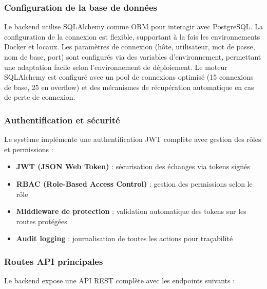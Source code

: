 \documentclass[a4paper, 12pt]{book}
\begin{document}
\subsubsection{Configuration de la base de données}

Le backend utilise SQLAlchemy comme ORM pour interagir avec PostgreSQL. La configuration de la connexion est flexible, supportant à la fois les environnements Docker et locaux. Les paramètres de connexion (hôte, utilisateur, mot de passe, nom de base, port) sont configurés via des variables d'environnement, permettant une adaptation facile selon l'environnement de déploiement. Le moteur SQLAlchemy est configuré avec un pool de connexions optimisé (15 connexions de base, 25 en overflow) et des mécanismes de récupération automatique en cas de perte de connexion.

\subsubsection{Authentification et sécurité}

Le système implémente une authentification JWT complète avec gestion des rôles et permissions :

\begin{itemize}
    \item \textbf{JWT (JSON Web Token)} : sécurisation des échanges via tokens signés
    \item \textbf{RBAC (Role-Based Access Control)} : gestion des permissions selon le rôle
    \item \textbf{Middleware de protection} : validation automatique des tokens sur les routes protégées
    \item \textbf{Audit logging} : journalisation de toutes les actions pour traçabilité
\end{itemize}

\subsubsection{Routes API principales}

Le backend expose une API REST complète avec les endpoints suivants :
\end{document}
